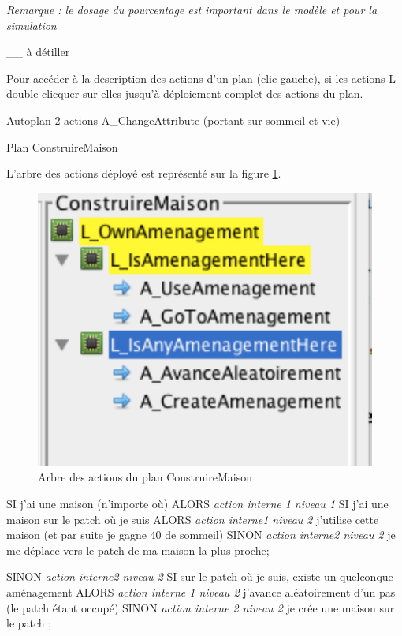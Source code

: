 \documentclass[a4paper,oneside,12 pt]{article}
\begin{document}
\textit{Remarque : le dosage du pourcentage est important dans le modèle et pour la simulation}

__ à détiller

Pour accéder à la description des actions d'un plan (clic gauche), si les actions L double clicquer sur elles jusqu'à déploiement complet des actions du plan.


Autoplan
	2 actions A_ChangeAttribute (portant sur sommeil et vie)
	
	
Plan ConstruireMaison

L'arbre des actions déployé est représenté sur la figure \ref{PL}.
\begin{figure}[!ht]
\begin{center}
\includegraphics[scale=0.5]{planex.pdf}
\caption[PL]{Arbre des actions du plan ConstruireMaison \\}
\label{PL}
\end{center}
\end{figure} 

SI j'ai une maison (n'importe où) ALORS
		\textit{action interne 1 niveau 1}
		SI j'ai une maison sur le patch où je suis ALORS
				\textit{action interne1 niveau 2 }
				j'utilise cette maison (et par suite je gagne 40 de sommeil)
		SINON
				\textit{action interne2 niveau 2 }
				je me déplace vers le patch de ma maison la plus proche;

SINON
		\textit{action interne2 niveau 2 }
		SI sur le patch où je suis, existe un quelconque aménagement ALORS
			\textit{ action interne 1 niveau 2} 
			 j'avance aléatoirement d'un pas (le patch étant occupé)
		SINON
			\textit{action interne 2 niveau 2 }
			je crée une maison sur le patch 
;
\end{document}

